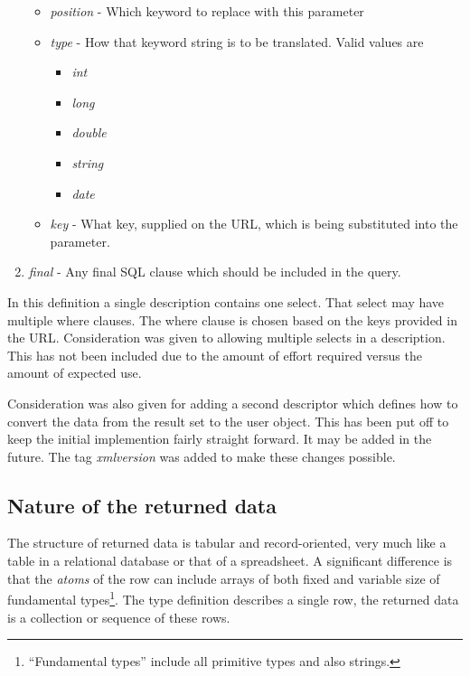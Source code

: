 \begin{enumerate}
\begin{itemize}
\item \emph{position} - Which keyword to replace with this parameter
\item \emph{type} - How that keyword string is to be translated.  Valid values are
\begin{itemize}
\item \emph{int}
\item \emph{long}
\item \emph{double}
\item \emph{string}
\item \emph{date}
\end{itemize}
\item \emph{key} - What key, supplied on the URL, which is being substituted into the parameter.
\end{itemize}
\item \emph{final} - Any final SQL clause which should be included in the query.

\end{enumerate}

In this definition a single description contains one select.  That select may have multiple where
clauses.  The where clause is chosen based on the keys provided in the URL.  Consideration was given
to allowing multiple selects in a description.  This has not been included due to the amount of 
effort required versus the amount of expected use.  

Consideration was also given for adding a second descriptor which defines how to convert the data
from the result set to the user object.  This has been put off to keep the initial implemention
fairly straight forward.  It may be added in the future.  The tag \emph{xmlversion} was added to 
make these changes possible.


\subsection{Nature of the returned data}

The structure of returned data is tabular and
record-oriented, very much like a table in a relational database or that
of a spreadsheet.
A significant difference is that the \emph{atoms} of the row can include
arrays of both fixed and variable size of fundamental \cpp
types\footnote{``Fundamental types'' include all primitive types and
also strings.}.  The type definition describes a single row, the
returned data is a collection or sequence of these rows.

